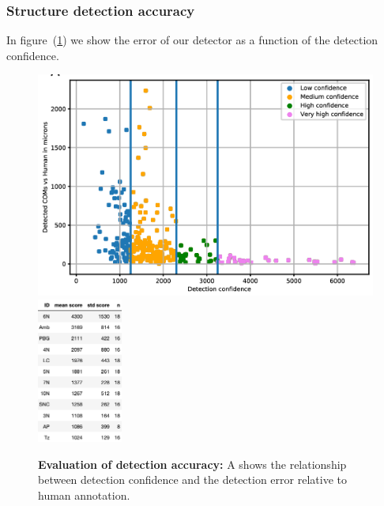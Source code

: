\documentclass[runningheads]{llncs}
\begin{document}
\subsubsection{Structure detection accuracy}
In figure~(\ref{fig:structureAccuracy}) we show the error of our
detector as a function of the detection confidence. 
\begin{figure}[t]
  \includegraphics[width=0.65
  \textwidth]{figures/ErrorVsConfidence.png}
  \hspace{1cm}
  \includegraphics[width=0.25\textwidth]{figures/ScoresOfStructures.png}
  \caption{\label{fig:structureAccuracy} {\bf Evaluation of detection
      accuracy:} A shows the relationship between detection confidence
    and the detection error relative to human annotation.}
\end{figure}
\end{document}
